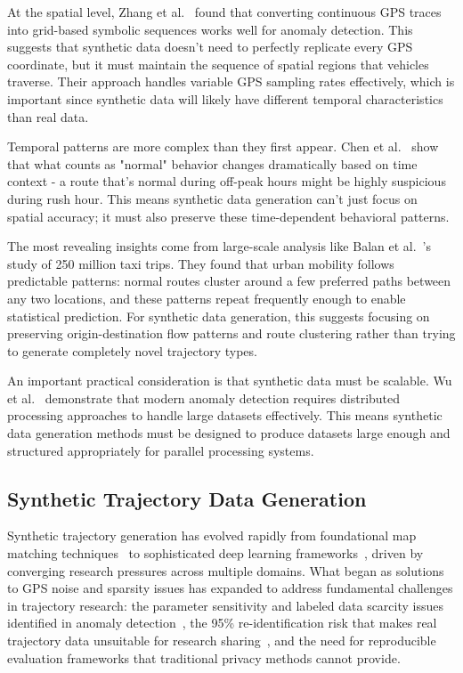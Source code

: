 \documentclass[runningheads]{llncs}
\begin{document}
At the spatial level, Zhang et al.~\cite{zhang2019ibat} found that converting continuous GPS traces into grid-based symbolic sequences works well for anomaly detection. This suggests that synthetic data doesn't need to perfectly replicate every GPS coordinate, but it must maintain the sequence of spatial regions that vehicles traverse. Their approach handles variable GPS sampling rates effectively, which is important since synthetic data will likely have different temporal characteristics than real data.

Temporal patterns are more complex than they first appear. Chen et al.~\cite{chen2021temporal} show that what counts as "normal" behavior changes dramatically based on time context - a route that's normal during off-peak hours might be highly suspicious during rush hour. This means synthetic data generation can't just focus on spatial accuracy; it must also preserve these time-dependent behavioral patterns.

The most revealing insights come from large-scale analysis like Balan et al.~\cite{balan2011real}'s study of 250 million taxi trips. They found that urban mobility follows predictable patterns: normal routes cluster around a few preferred paths between any two locations, and these patterns repeat frequently enough to enable statistical prediction. For synthetic data generation, this suggests focusing on preserving origin-destination flow patterns and route clustering rather than trying to generate completely novel trajectory types.

An important practical consideration is that synthetic data must be scalable. Wu et al.~\cite{wu2024safety} demonstrate that modern anomaly detection requires distributed processing approaches to handle large datasets effectively. This means synthetic data generation methods must be designed to produce datasets large enough and structured appropriately for parallel processing systems.

\subsection{Synthetic Trajectory Data Generation}
\label{sec:generation-review}

Synthetic trajectory generation has evolved rapidly from foundational map matching techniques~\cite{newson2009hidden} to sophisticated deep learning frameworks~\cite{cao2021generating,wang2025gtg}, driven by converging research pressures across multiple domains. What began as solutions to GPS noise and sparsity issues has expanded to address fundamental challenges in trajectory research: the parameter sensitivity and labeled data scarcity issues identified in anomaly detection~\cite{zhang2019ibat}, the 95\% re-identification risk that makes real trajectory data unsuitable for research sharing~\cite{rao2023cats}, and the need for reproducible evaluation frameworks that traditional privacy methods cannot provide.
\end{document}

